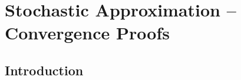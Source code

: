 
\chapter{Stochastic Approximation -- Convergence Proofs}\label{stoch apprx}
\section{Introduction}


\endinput